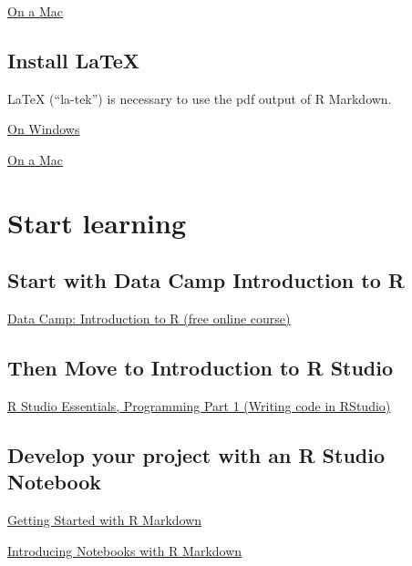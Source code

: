 \documentclass[]{book}
\theoremstyle{definition}
\theoremstyle{definition}
\theoremstyle{definition}
\theoremstyle{remark}
\begin{document}
\href{https://medium.com/@GalarnykMichael/install-r-and-rstudio-on-mac-e911606ce4f4}{On
a Mac}

\subsection{Install LaTeX}\label{install-latex}

LaTeX (``la-tek'') is necessary to use the pdf output of R Markdown.

\href{https://medium.com/@sorenlind/create-pdf-reports-using-r-r-markdown-latex-and-knitr-on-windows-10-952b0c48bfa9}{On
Windows}

\href{https://medium.com/@sorenlind/create-pdf-reports-using-r-r-markdown-latex-and-knitr-on-macos-high-sierra-e7b5705c9fd}{On
a Mac}

\section{Start learning}\label{start-learning}

\subsection{Start with Data Camp Introduction to
R}\label{start-with-data-camp-introduction-to-r}

\href{https://www.datacamp.com/courses/free-introduction-to-r}{Data
Camp: Introduction to R (free online course)}

\subsection{Then Move to Introduction to R
Studio}\label{then-move-to-introduction-to-r-studio}

\href{https://www.rstudio.com/resources/webinars/rstudio-essentials-webinar-series-part-1/}{R
Studio Essentials, Programming Part 1 (Writing code in RStudio)}

\subsection{Develop your project with an R Studio
Notebook}\label{develop-your-project-with-an-r-studio-notebook}

\href{https://www.rstudio.com/resources/webinars/getting-started-with-r-markdown/}{Getting
Started with R Markdown}

\href{https://www.rstudio.com/resources/webinars/introducing-notebooks-with-r-markdown/}{Introducing
Notebooks with R Markdown}
\end{document}
